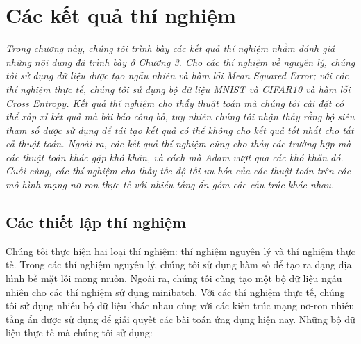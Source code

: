 \chapter{Các kết quả thí nghiệm}
\label{Chapter4}

\textit{Trong chương này, chúng tôi trình bày các kết quả thí nghiệm nhằm đánh giá những nội dung đã trình bày ở Chương 3. Cho các thí nghiệm về nguyên lý, chúng tôi sử dụng dữ liệu được tạo ngẫu nhiên và hàm lỗi Mean Squared Error; với các thí nghiệm thực tế, chúng tôi sử dụng bộ dữ liệu MNIST và CIFAR10 và hàm lỗi Cross Entropy. Kết quả thí nghiệm cho thấy thuật toán mà chúng tôi cài đặt có thể xấp xỉ kết quả mà bài báo công bố, tuy nhiên chúng tôi nhận thấy rằng bộ siêu tham số được sử dụng để tái tạo kết quả có thể không cho kết quả tốt nhất cho tất cả thuật toán. Ngoài ra, các kết quả thí nghiệm cũng cho thấy các trường hợp mà các thuật toán khác gặp khó khăn, và cách mà Adam vượt qua các khó khăn đó. Cuối cùng, các thí nghiệm cho thấy tốc độ tối ưu hóa của các thuật toán trên các mô hình mạng nơ-ron thực tế với nhiều tầng ẩn gồm các cấu trúc khác nhau.}

\section{Các thiết lập thí nghiệm}

Chúng tôi thực hiện hai loại thí nghiệm: thí nghiệm nguyên lý và thí nghiệm thực tế. Trong các thí nghiệm nguyên lý, chúng tôi sử dụng hàm số để tạo ra dạng địa hình bề mặt lỗi mong muốn. Ngoài ra, chúng tôi cũng tạo một bộ dữ liệu ngẫu nhiên cho các thí nghiệm sử dụng minibatch. Với các thí nghiệm thực tế, chúng tôi sử dụng nhiều bộ dữ liệu khác nhau cùng với các kiến trúc mạng nơ-ron nhiều tầng ẩn được sử dụng để giải quyết các bài toán ứng dụng hiện nay. Những bộ dữ liệu thực tế mà chúng tôi sử dụng:

